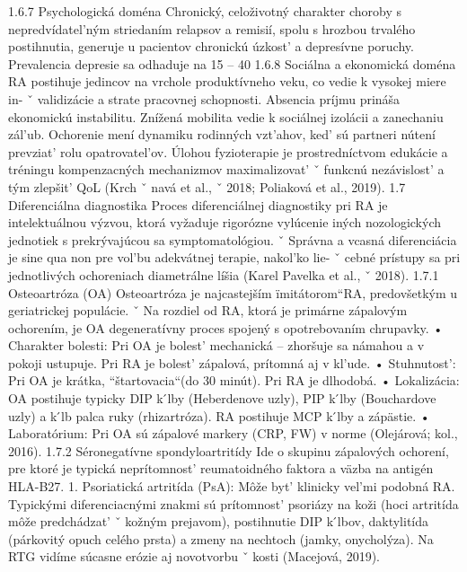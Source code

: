 { 1.6.7 Psychologická doména Chronický, celoživotný charakter choroby s nepredvídatel’ným striedaním relapsov a remisií, spolu s hrozbou trvalého postihnutia, generuje u pacientov chronickú úzkost’ a depresívne poruchy. Prevalencia depresie sa odhaduje na 15 – 40 %
 1.6.8 Sociálna a ekonomická doména RA postihuje jedincov na vrchole produktívneho veku, co vedie k vysokej miere in- ˇ validizácie a strate pracovnej schopnosti. Absencia príjmu prináša ekonomickú instabilitu.
 Znížená mobilita vedie k sociálnej izolácii a zanechaniu zál’ub. Ochorenie mení dynamiku rodinných vzt’ahov, ked’ sú partneri nútení prevziat’ rolu opatrovatel’ov. Úlohou fyzioterapie je prostredníctvom edukácie a tréningu kompenzacných mechanizmov maximalizovat’ ˇ funkcnú nezávislost’ a tým zlepšit’ QoL (Krch ˇ navá et al., ˇ 2018; Poliaková et al., 2019).
 1.7 Diferenciálna diagnostika Proces diferenciálnej diagnostiky pri RA je intelektuálnou výzvou, ktorá vyžaduje rigorózne vylúcenie iných nozologických jednotiek s prekrývajúcou sa symptomatológiou. ˇ Správna a vcasná diferenciácia je sine qua non pre vol’bu adekvátnej terapie, nakol’ko lie- ˇ cebné prístupy sa pri jednotlivých ochoreniach diametrálne líšia (Karel Pavelka et al., ˇ 2018).
 1.7.1 Osteoartróza (OA) Osteoartróza je najcastejším ïmitátorom``RA, predovšetkým u geriatrickej populácie. ˇ Na rozdiel od RA, ktorá je primárne zápalovým ochorením, je OA degeneratívny proces spojený s opotrebovaním chrupavky.
 • Charakter bolesti: Pri OA je bolest’ mechanická – zhoršuje sa námahou a v pokoji ustupuje. Pri RA je bolest’ zápalová, prítomná aj v kl’ude.
 • Stuhnutost’: Pri OA je krátka, ``štartovacia``(do 30 minút). Pri RA je dlhodobá.
 • Lokalizácia: OA postihuje typicky DIP k ́lby (Heberdenove uzly), PIP k ́lby (Bouchardove uzly) a k ́lb palca ruky (rhizartróza). RA postihuje MCP k ́lby a zápästie.
 • Laboratórium: Pri OA sú zápalové markery (CRP, FW) v norme (Olejárová; kol., 2016).
 1.7.2 Séronegatívne spondyloartritídy Ide o skupinu zápalových ochorení, pre ktoré je typická neprítomnost’ reumatoidného faktora a väzba na antigén HLA-B27.
 1. Psoriatická artritída (PsA): Môže byt’ klinicky vel’mi podobná RA. Typickými diferenciacnými znakmi sú prítomnost’ psoriázy na koži (hoci artritída môže predchádzat’ ˇ kožným prejavom), postihnutie DIP k ́lbov, daktylitída (párkovitý opuch celého prsta) a zmeny na nechtoch (jamky, onycholýza). Na RTG vidíme súcasne erózie aj novotvorbu ˇ kosti (Macejová, 2019).
}
